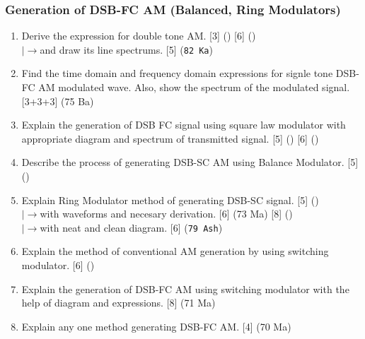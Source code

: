 \documentclass[12pt]{article}
\newcommand{\lb}{\\$\left|\rightarrow\right.$}
\begin{document}
    \subsubsection{Generation of DSB-FC AM (Balanced, Ring Modulators)}
      \begin{enumerate}
        \item Derive the expression for double tone AM. \hfill [3] () [6] ()
          \lb and draw its line spectrums. \hfill [5] (\texttt{82 Ka})

        \item Find the time domain and frequency domain expressions for signle tone DSB-FC AM modulated wave. Also, show the spectrum of the modulated signal. \hfill [3+3+3] (75 Ba)

        \item Explain the generation of DSB FC signal using square law modulator with appropriate diagram and spectrum of transmitted signal. \hfill [5] () [6] ()

        \item Describe the process of generating DSB-SC AM using Balance Modulator. \hfill [5] ()

        \item Explain Ring Modulator method of generating DSB-SC signal. \hfill [5] ()
          \lb with waveforms and necesary derivation. \hfill [6] (73 Ma) [8] ()
          \lb with neat and clean diagram. \hfill [6] (\texttt{79 Ash})

        \item Explain the method of conventional AM generation by using switching modulator. \hfill [6] ()

        \item Explain the generation of DSB-FC AM using switching modulator with the help of diagram and expressions. \hfill [8] (71 Ma)

        \item Explain any one method generating DSB-FC AM. \hfill [4] (70 Ma)
      \end{enumerate}
\end{document}
